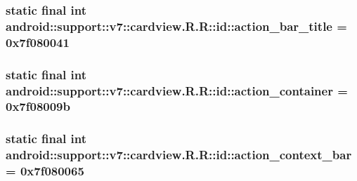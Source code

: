 \hypertarget{classandroid_1_1support_1_1v7_1_1cardview_1_1_r_1_1id_f121a982c5e6cf89cf579d6d270de0e5}{
\subsubsection[{action\_\-bar\_\-title}]{\setlength{\rightskip}{0pt plus 5cm}static final int android::support::v7::cardview.R.R::id::action\_\-bar\_\-title = 0x7f080041}}
\label{classandroid_1_1support_1_1v7_1_1cardview_1_1_r_1_1id_f121a982c5e6cf89cf579d6d270de0e5}


\hypertarget{classandroid_1_1support_1_1v7_1_1cardview_1_1_r_1_1id_bcf2d6da034458a8230bc614a5845438}{
\subsubsection[{action\_\-container}]{\setlength{\rightskip}{0pt plus 5cm}static final int android::support::v7::cardview.R.R::id::action\_\-container = 0x7f08009b}}
\label{classandroid_1_1support_1_1v7_1_1cardview_1_1_r_1_1id_bcf2d6da034458a8230bc614a5845438}


\hypertarget{classandroid_1_1support_1_1v7_1_1cardview_1_1_r_1_1id_0af97f61bd6e4797a947f084e39bfb06}{
\subsubsection[{action\_\-context\_\-bar}]{\setlength{\rightskip}{0pt plus 5cm}static final int android::support::v7::cardview.R.R::id::action\_\-context\_\-bar = 0x7f080065}}
\label{classandroid_1_1support_1_1v7_1_1cardview_1_1_r_1_1id_0af97f61bd6e4797a947f084e39bfb06}


